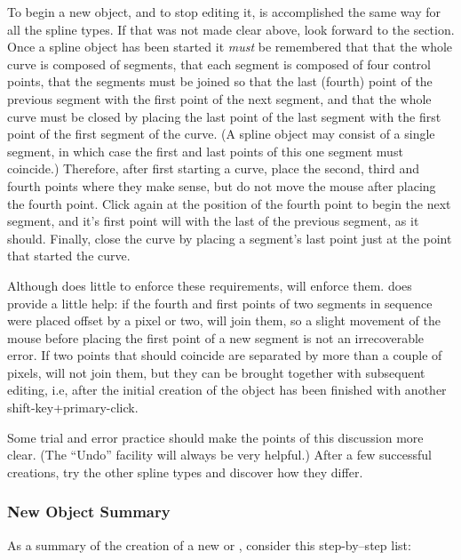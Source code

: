 			To begin a new object, and to stop editing it,
			is accomplished the same way for all the spline types.
			If that was not made
			clear above, look forward to the
			 section.
			Once a \IXbezn{} spline object has been started
			it \emph{must} be remembered that that the whole
			curve is composed of segments, that each segment
			is composed of four control points, that the
			segments must be joined so that the last (fourth) point
			of the previous segment  with
			the first point of the next segment,
			and that the whole curve must be closed by
			placing the last point of the last segment
			 with the first point
			of the first segment of the curve.
			(A \IXbezn{} spline object
			may consist of a single segment, in which case
			the first and last points of this one segment
			must coincide.) Therefore, after first starting
			a \IXbezn{} curve, place the second, third and
			fourth points where they make sense, but do not
			move the mouse after placing the fourth point.
			Click again at the position of the fourth point
			to begin the next segment, and it's
			first point will  with the
			last of the previous segment, as it should.
			Finally, close the curve by placing a segment's
			last point just at the point that started the curve.
			
			Although \IXpkg{} does little to enforce these
			requirements, \IXpov{} will enforce them.
			\IXpkgu{} does provide a little help: if the
			fourth and first points of two segments in
			sequence were placed offset by a pixel or two,
			\IXpkg{} will join them, so a slight movement
			of the mouse before placing the first point
			of a new segment is not an irrecoverable error.
			If two points that should coincide are separated
			by more than a couple of pixels,
			\IXpkg{} will not join them, but they can be brought
			together with subsequent editing, i.e, after the
			initial creation of the object has been
			finished with another shift-key+primary-click.
			
			Some trial and error practice should make the
			points of this discussion more clear.
			(The ``Undo'' facility will always be very
			helpful.) After a few successful \IXbezn{}
			creations, try the other spline types and discover
			how they differ.


			\subsubsection{New Object Summary}%
			\label{sssec:new_obj_summary}
			As a summary of the creation of a new 
			or , consider this step-by--step list:
			
